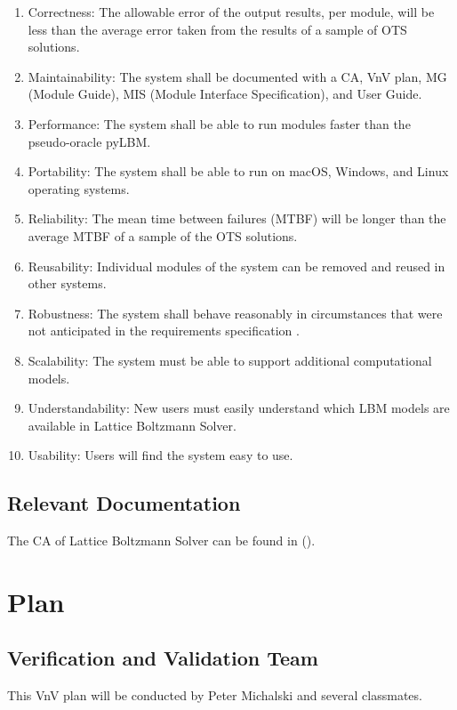 \documentclass[12pt, titlepage]{article}
\newcommand{\myprogname}{Lattice Boltzmann Solver}
\begin{document}
\begin{enumerate}
\item Correctness: The allowable error of the output results, per module, will be less than the average error taken from the results of a sample of OTS solutions.
\item Maintainability: The system shall be documented with a CA, VnV plan, MG (Module Guide), MIS (Module Interface Specification), and User Guide.
\item Performance: The system shall be able to run modules faster than the pseudo-oracle pyLBM.
\item Portability: The system shall be able to run on macOS, Windows, and Linux operating systems.
\item Reliability: The mean time between failures (MTBF) will be longer than the average MTBF of a sample of the OTS solutions.
\item Reusability: Individual modules of the system can be removed and reused in other systems.
\item Robustness: The system shall behave reasonably in circumstances that were not anticipated in the requirements specification \cite{ghezzi1991fundamentals}.
\item Scalability: The system must be able to support additional computational models.
\item Understandability: New users must easily understand which LBM models are available in {\myprogname}.
\item Usability: Users will find the system easy to use.
\end{enumerate}


\subsection{Relevant Documentation}

The CA of {\myprogname} can be found in (\citet{LBM_CA_PM}).\\ 

\newpage

\section{Plan}
\label{testplan}	
\subsection{Verification and Validation Team}

This VnV plan will be conducted by Peter Michalski and several classmates.
\end{document}
